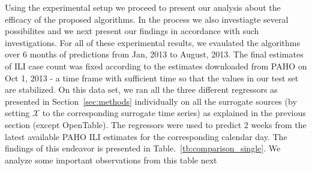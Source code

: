 Using the experimental setup we proceed to present our analysis about the efficacy 
of the proposed algorithms. In the process we also investiagte several possibilites 
and we next present our findings in accordance with such investigations. For all of 
these experimental results, we evaulated the algorithms over 6 months of predictions 
from Jan, 2013 to August, 2013. The final estimates of ILI case count was fixed according
to the estimates downloaded from PAHO on Oct 1, 2013 - a time frame with sufficient time
so that the values in our test set are stabilized. On this data set, we ran all the three different 
regressors as presented in Section~\ref{sec:methods} individually on all the surrogate sources (by setting
$\mathcal{X}$ to the corresponding surrogate time series)
as explained in the previous section (except OpenTable). The regressors were used to predict
2 weeks from the latest available PAHO ILI estimates for the corresponding calendar day. 
The findings of this endeavor is presented in Table.~\ref{tb:comparison_single}. We analyze 
some important observations from this table next

